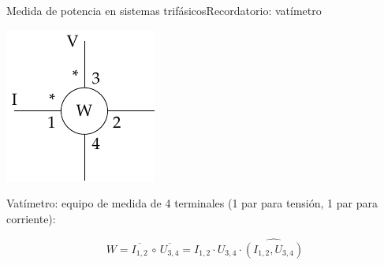\documentclass[aspectratio=169, xcolor={usenames,svgnames,dvipsnames}]{beamer}
\begin{document}
\begin{frame}{Medida de potencia en sistemas trifásicos}{Recordatorio: vatímetro}
\begin{center}
\includegraphics[height=0.5\textheight]{../figs/vatimetro_2.pdf}
\end{center}

\alert{Vatímetro}: equipo de medida de 4 terminales (1 par para tensión, 1 par para corriente):

\begin{equation*}
	    W=\overline{I_{1,2}}\,\circ\,\overline{U_{3,4}}=I_{1,2}\cdot U_{3,4}\cdot \widehat{(I_{1,2}, U_{3,4})}
	\end{equation*}
\end{frame}
\end{document}
